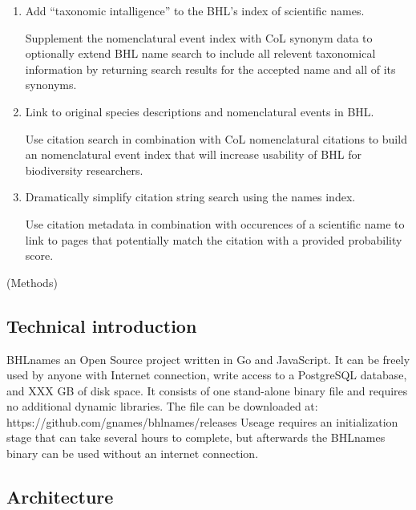 \documentclass[
]{article}
\begin{document}
\begin{enumerate}
\def\labelenumi{\arabic{enumi}.}
\item
  Add ``taxonomic intalligence'' to the BHL's index of scientific names.

  Supplement the nomenclatural event index with CoL synonym data to
  optionally extend BHL name search to include all relevent taxonomical
  information by returning search results for the accepted name and all
  of its synonyms.
\item
  Link to original species descriptions and nomenclatural events in BHL.

  Use citation search in combination with CoL nomenclatural citations to
  build an nomenclatural event index that will increase usability of BHL
  for biodiversity researchers.
\item
  Dramatically simplify citation string search using the names index.

  Use citation metadata in combination with occurences of a scientific
  name to link to pages that potentially match the citation with a
  provided probability score.
\end{enumerate}

(Methods)

\hypertarget{technical-introduction}{%
\subsection{Technical introduction}\label{technical-introduction}}

BHLnames an Open Source project written in Go and JavaScript. It can be
freely used by anyone with Internet connection, write access to a
PostgreSQL database, and XXX GB of disk space. It consists of one
stand-alone binary file and requires no additional dynamic libraries.
The file can be downloaded at:
https://github.com/gnames/bhlnames/releases Useage requires an
initialization stage that can take several hours to complete, but
afterwards the BHLnames binary can be used without an internet
connection.

\hypertarget{architecture}{%
\subsection{Architecture}\label{architecture}}
\end{document}

